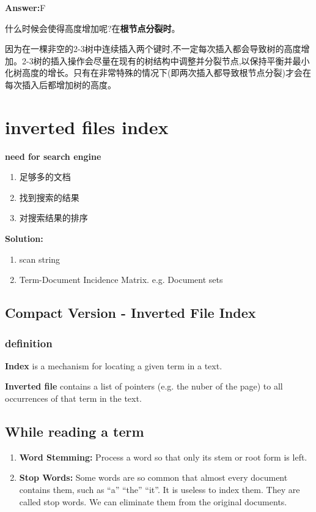 \documentclass{article}
\begin{document}
\textbf{Answer:}F

什么时候会使得高度增加呢?在\textbf{根节点分裂时}。

因为在一棵非空的2-3树中连续插入两个键时,不一定每次插入都会导致树的高度增加。2-3树的插入操作会尽量在现有的树结构中调整并分裂节点,以保持平衡并最小化树高度的增长。只有在非常特殊的情况下(即两次插入都导致根节点分裂)才会在每次插入后都增加树的高度。

\newpage
\section{inverted files index}
\textbf{need for search engine}
\begin{enumerate}
    \item 足够多的文档
    \item 找到搜索的结果
    \item 对搜索结果的排序
\end{enumerate}

\textbf{Solution:}
\begin{enumerate}
    \item scan string
    \item Term-Document Incidence Matrix. e.g. Document sets  
\end{enumerate}

\subsection{Compact Version - Inverted File Index}
\subsubsection*{definition}
\textbf{Index} is a mechanism for locating a given term in a text. \par
\textbf{Inverted file} contains a list of pointers (e.g. the nuber of the page) to all occurrences of that term in the text. 

\subsection{While reading a term}
\begin{enumerate}
    \item \textbf{Word Stemming:} Process a word so that only its stem or root form is left. 
    \item \textbf{Stop Words:} Some words are so common that almost every document contains them, such as ``a'' ``the'' ``it''.  It is useless to index them.  They are called stop words.  We can eliminate them from the original documents.
\end{enumerate}
\end{document}
